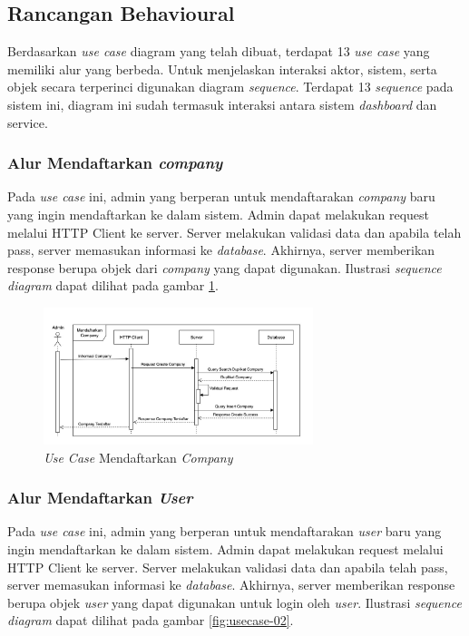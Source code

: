 \subsection{Rancangan Behavioural}
\label{subsec:arsitektur-behavioural}

Berdasarkan \textit{use case} diagram yang telah dibuat, terdapat 13 \textit{use case} yang memiliki alur yang berbeda. Untuk menjelaskan interaksi aktor, sistem, serta objek secara terperinci digunakan diagram \textit{sequence}. Terdapat 13 \textit{sequence} pada sistem ini, diagram ini sudah termasuk interaksi antara sistem \textit{dashboard} dan service.

\subsubsection{Alur Mendaftarkan \textit{company}}

Pada \textit{use case} ini, admin yang berperan untuk mendaftarakan \textit{company} baru yang ingin mendaftarkan ke dalam sistem. Admin dapat melakukan request melalui HTTP Client ke server. Server melakukan validasi data dan apabila telah pass, server memasukan informasi ke \textit{database}. Akhirnya, server memberikan response berupa objek dari \textit{company} yang dapat digunakan. Ilustrasi \textit{sequence diagram} dapat dilihat pada gambar \ref{fig:usecase-01}.

\begin{figure}[ht]
  \centering
  \includegraphics[width=0.7\textwidth]{resources/chapter-3/usecase/uc-01.jpg}
  \caption{\textit{Use Case} Mendaftarkan \textit{Company}}
  \label{fig:usecase-01}
\end{figure}

\subsubsection{Alur Mendaftarkan \textit{User}}

Pada \textit{use case} ini, admin yang berperan untuk mendaftarakan \textit{user} baru yang ingin mendaftarkan ke dalam sistem. Admin dapat melakukan request melalui HTTP Client ke server. Server melakukan validasi data dan apabila telah pass, server memasukan informasi ke \textit{database}. Akhirnya, server memberikan response berupa objek \textit{user} yang dapat digunakan untuk login oleh \textit{user}. Ilustrasi \textit{sequence diagram} dapat dilihat pada gambar \ref{fig:usecase-02}.

